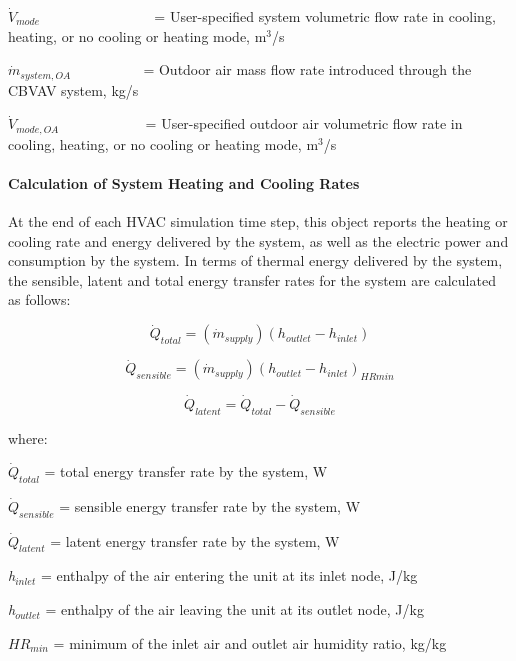 \({\dot V_{mode}}\) ~~~~~~~~~~~~~~~ = User-specified system volumetric flow rate in cooling, heating, or no cooling or heating mode, m\(^{3}\)/s

\({\dot m_{system,OA}}\) ~~~~~~~~~ = Outdoor air mass flow rate introduced through the CBVAV system, kg/s

\({\dot V_{mode,OA}}\) ~~~~~~~~~~~ = User-specified outdoor air volumetric flow rate in cooling, heating, or no cooling or heating mode, m\(^{3}\)/s

\paragraph{Calculation of System Heating and Cooling Rates}\label{calculation-of-system-heating-and-cooling-rates}

At the end of each HVAC simulation time step, this object reports the heating or cooling rate and energy delivered by the system, as well as the electric power and consumption by the system. In terms of thermal energy delivered by the system, the sensible, latent and total energy transfer rates for the system are calculated as follows:

\begin{equation}
{\dot Q_{total}} = ({\dot m_{supply}})({h_{outlet}} - {h_{inlet}})
\end{equation}

\begin{equation}
{\dot Q_{sensible}} = ({\dot m_{supply}}){({h_{outlet}} - {h_{inlet}})_{HRmin}}
\end{equation}

\begin{equation}
{\dot Q_{latent}} = {\dot Q_{total}} - {\dot Q_{sensible}}
\end{equation}

where:

\(\dot{Q}_{total}\) = total energy transfer rate by the system, W

\(\dot{Q}_{sensible}\) = sensible energy transfer rate by the system, W

\(\dot{Q}_{latent}\) = latent energy transfer rate by the system, W

\emph{h\(_{inlet}\)} = enthalpy of the air entering the unit at its inlet node, J/kg

\emph{h\(_{outlet}\)} = enthalpy of the air leaving the unit at its outlet node, J/kg

\(H{R_{min}}\) = minimum of the inlet air and outlet air humidity ratio, kg/kg

